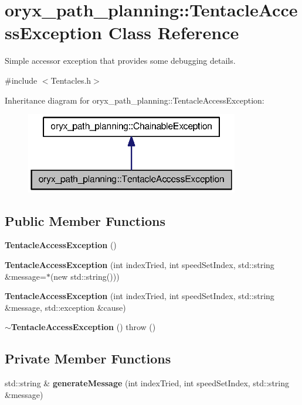 \section{oryx\-\_\-path\-\_\-planning\-:\-:\-Tentacle\-Access\-Exception \-Class \-Reference}
\label{classoryx__path__planning_1_1TentacleAccessException}


\-Simple accessor exception that provides some debugging details.  




{\ttfamily \#include $<$\-Tentacles.\-h$>$}



\-Inheritance diagram for oryx\-\_\-path\-\_\-planning\-:\-:\-Tentacle\-Access\-Exception\-:
\nopagebreak
\begin{figure}[H]
\begin{center}
\leavevmode
\includegraphics[width=264pt]{classoryx__path__planning_1_1TentacleAccessException__inherit__graph}
\end{center}
\end{figure}
\subsection*{\-Public \-Member \-Functions}
\begin{DoxyCompactItemize}
\item 
{\bf \-Tentacle\-Access\-Exception} ()
\item 
{\bf \-Tentacle\-Access\-Exception} (int index\-Tried, int speed\-Set\-Index, std\-::string \&message=$\ast$(new std\-::string()))
\item 
{\bf \-Tentacle\-Access\-Exception} (int index\-Tried, int speed\-Set\-Index, std\-::string \&message, std\-::exception \&cause)
\item 
{\bf $\sim$\-Tentacle\-Access\-Exception} ()  throw ()
\end{DoxyCompactItemize}
\subsection*{\-Private \-Member \-Functions}
\begin{DoxyCompactItemize}
\item 
std\-::string \& {\bf generate\-Message} (int index\-Tried, int speed\-Set\-Index, std\-::string \&message)
\end{DoxyCompactItemize}


